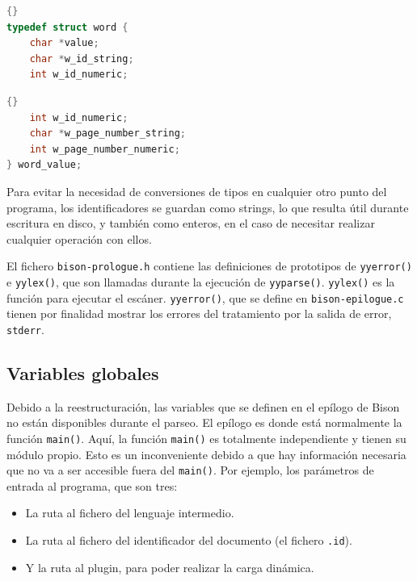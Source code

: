 \noindent\begin{minipage}{.45\textwidth}
    \begin{lstlisting}[language=C,caption={},label={}]{}
typedef struct word {
    char *value;
    char *w_id_string;
    int w_id_numeric;
    \end{lstlisting}
\end{minipage}\hfill
\begin{minipage}{.45\textwidth}
    \begin{lstlisting}[language=C,caption={},label={}]{}
    int w_id_numeric;
    char *w_page_number_string;
    int w_page_number_numeric;
} word_value;
    \end{lstlisting}
\end{minipage}

Para evitar la necesidad de conversiones de tipos en cualquier otro punto del programa, los identificadores se guardan como strings, lo que resulta útil durante escritura en disco, y también como enteros, en el caso de necesitar realizar cualquier operación con ellos.

El fichero \verb|bison-prologue.h| contiene las definiciones de prototipos de \verb|yyerror()| e \verb|yylex()|, que son llamadas durante la ejecución de \verb|yyparse()|. \verb|yylex()| es la función para ejecutar el escáner. \verb|yyerror()|, que se define en \verb|bison-epilogue.c| tienen por finalidad mostrar los errores del tratamiento por la salida de error, \verb|stderr|.

\subsection{Variables globales}

Debido a la reestructuración, las variables que se definen en el epílogo de Bison no están disponibles durante el parseo. El epílogo es donde está normalmente la función \verb|main()|. Aquí, la función \verb|main()| es totalmente independiente y tienen su módulo propio. Esto es un inconveniente debido a que hay información necesaria que no va a ser accesible fuera del \verb|main()|. Por ejemplo, los parámetros de entrada al programa, que son tres:

\begin{itemize}
    \item La ruta al fichero del lenguaje intermedio.
    \item La ruta al fichero del identificador del documento (el fichero \verb|.id|).
    \item Y la ruta al plugin, para poder realizar la carga dinámica.
\end{itemize}

